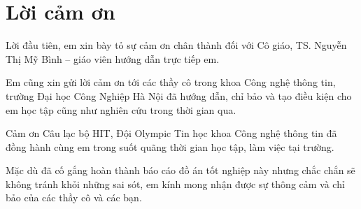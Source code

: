 \documentclass[envcountsame,envcountchap, openany, 14pt]{mysvmono2}
\begin{document}
\frontmatter%
\mainmatter%


\section*{\centering Lời cảm ơn}

Lời đầu tiên, em xin bày tỏ sự cảm ơn chân thành đối với Cô giáo, TS.
Nguyễn Thị Mỹ Bình – giáo viên hướng dẫn trực tiếp em.

Em cũng xin gửi lời cảm ơn tới các thầy cô trong khoa Công nghệ thông tin,
trường Đại học Công Nghiệp Hà Nội đã hướng dẫn, chỉ bảo và tạo điều kiện cho em
học tập cũng như nghiên cứu trong thời gian qua.

Cảm ơn Câu lạc bộ HIT, Đội Olympic Tin học khoa Công nghệ thông tin đã đồng hành
cùng em trong suốt quãng thời gian học tập, làm việc tại trường.

Mặc dù đã cố gắng hoàn thành báo cáo đồ án tốt nghiệp này nhưng chắc chắn
sẽ không tránh khỏi những sai sót, em kính mong nhận được sự thông cảm và chỉ
bảo của các thầy cô và các bạn.

\tableofcontents







% 

\backmatter%
\medskip



\end{document}
